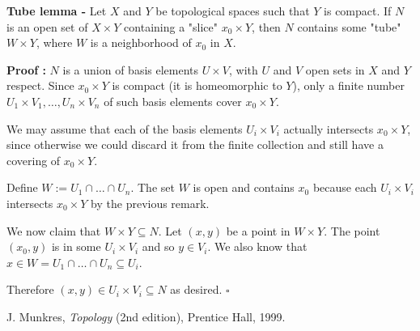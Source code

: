 \documentclass[12pt]{article}
\begin{document}
{\bf Tube lemma -} Let $X$ and $Y$ be topological spaces such that $Y$ is compact. If $N$ is an open set of $X \times Y$ containing a "slice" $x_0 \times Y$, then $N$ contains some "tube" $W \times Y$, where $W$ is a neighborhood of $x_0$ in $X$.

{\bf Proof :} $N$ is a union of basis elements $U \times V$, with $U$ and $V$ open sets in $X$ and $Y$ respect. Since $x_0 \times Y$ is compact (it is homeomorphic to $Y$), only a finite number $U_1 \times V_1, \dots, U_n \times V_n$ of such basis elements cover $x_0 \times Y$.

We may assume that each of the basis elements $U_i \times V_i$ actually intersects $x_0 \times Y$, since otherwise we could discard it from the finite collection and still have a covering of $x_0 \times Y$.

Define $W:=U_1 \cap \dots \cap U_n$. The set $W$ is open and contains $x_0$ because each $U_i \times V_i$ intersects $x_0 \times Y$ by the previous remark.

We now claim that $W \times Y \subseteq N$. Let $(x, y)$ be a point in $W \times Y$. The point $(x_0, y)$ is in some $U_i \times V_i$ and so $y \in V_i$. We also know that $x \in W = U_1 \cap \dots \cap U_n \subseteq U_i$.

Therefore $(x, y) \in U_i \times V_i \subseteq N$ as desired. $\square$

\begin{thebibliography}{9}
 J. Munkres, \emph{Topology} (2nd edition), Prentice Hall, 1999.
\end{thebibliography}
\end{document}
